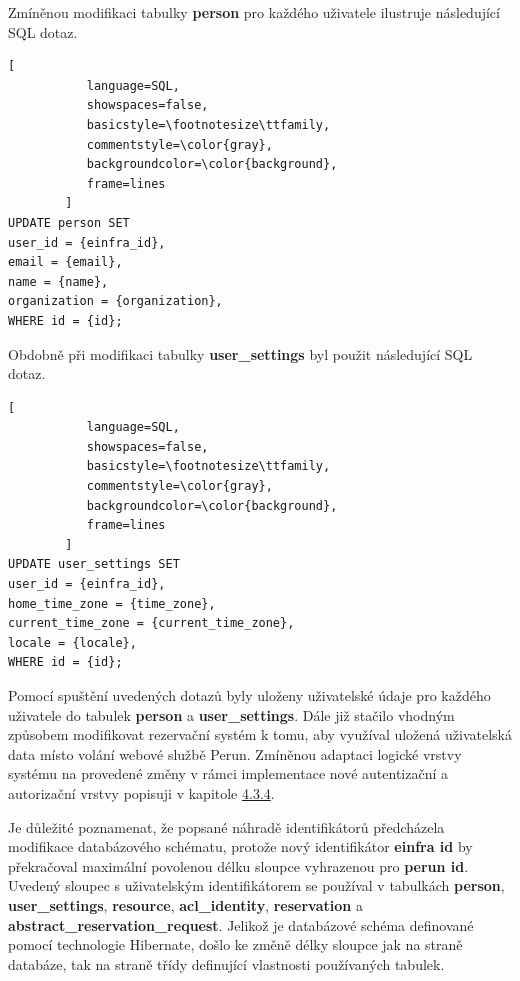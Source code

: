 \documentclass[
  printed, %
  twoside, %
  table,   %
  nolof,     %
  nolot,     %
]{fithesis3}
\begin{document}
Zmíněnou modifikaci tabulky \textbf{person} pro každého uživatele ilustruje následující SQL dotaz.

\begin{lstlisting}[
           language=SQL,
           showspaces=false,
           basicstyle=\footnotesize\ttfamily,
           commentstyle=\color{gray},
           backgroundcolor=\color{background},
           frame=lines
        ]
UPDATE person SET 
user_id = {einfra_id},
email = {email},
name = {name},
organization = {organization},
WHERE id = {id};
\end{lstlisting}

Obdobně při modifikaci tabulky \textbf{user\_settings} byl použit následující SQL dotaz. 

\begin{lstlisting}[
           language=SQL,
           showspaces=false,
           basicstyle=\footnotesize\ttfamily,
           commentstyle=\color{gray},
           backgroundcolor=\color{background},
           frame=lines
        ]
UPDATE user_settings SET 
user_id = {einfra_id},
home_time_zone = {time_zone},
current_time_zone = {current_time_zone},
locale = {locale},
WHERE id = {id};
\end{lstlisting}

Pomocí spuštění uvedených dotazů byly uloženy uživatelské údaje pro každého uživatele do tabulek \textbf{person} a \textbf{user\_settings}. Dále již stačilo vhodným způsobem modifikovat rezervační systém  k tomu, aby využíval uložená uživatelská data místo volání webové službě Perun. Zmíněnou adaptaci logické vrstvy systému  na provedené změny v rámci implementace nové autentizační a autorizační vrstvy popisuji v kapitole \hyperref[ShongoImpl-web]{4.3.4}. 

\par

Je důležité poznamenat, že popsané náhradě identifikátorů předcházela modifikace databázového schématu, protože nový identifikátor \textbf{einfra id} by překračoval maximální povolenou délku sloupce vyhrazenou pro \textbf{perun id}. Uvedený sloupec s uživatelským identifikátorem se používal v tabulkách \textbf{person}, \textbf{user\_settings}, \textbf{resource}, \textbf{acl\_identity}, \textbf{reservation} a \textbf{abstract\_reservation\_request}. Jelikož je databázové schéma definované pomocí technologie Hibernate, došlo ke změně délky sloupce jak na straně databáze, tak na straně třídy definující vlastnosti používaných tabulek. 
\end{document}

